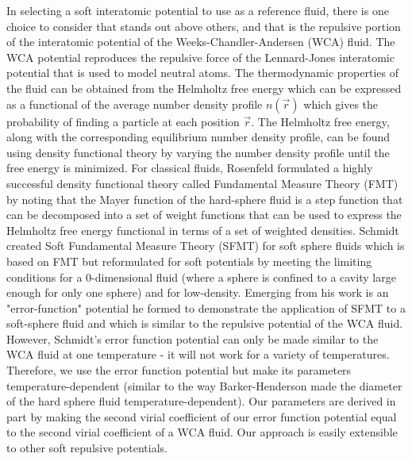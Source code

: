 \documentclass[double,12pt]{revtex4-2}
\begin{document}
In selecting a soft interatomic potential to use as a reference fluid, 
there is one choice to consider that stands out above others, and that is 
the repulsive portion of the interatomic potential of the 
Weeks-Chandler-Andersen (WCA) fluid.
The WCA potential reproduces the repulsive force of the Lennard-Jones 
interatomic potential that is used to model neutral atoms. 
The thermodynamic properties of the fluid can be obtained from the 
Helmholtz free energy which
can be expressed as a functional of the average number 
density profile $n(\vec r)$ 
which gives the probability of finding a particle at each position $\vec r$. 
The Helmholtz free energy, along with the corresponding equilibrium number density profile,
can be found using density functional theory by 
varying the number density profile until the free energy is minimized.
For classical fluids, Rosenfeld formulated a highly successful 
density functional theory called Fundamental Measure Theory (FMT)
by noting that the Mayer function of the hard-sphere fluid is a step function
that can be decomposed into a set of weight functions that can be used 
to express the Helmholtz free energy functional in terms of a set of weighted densities. 
Schmidt created Soft Fundamental Measure Theory (SFMT) for soft sphere 
fluids which is based on FMT but reformulated for soft potentials by 
meeting the limiting conditions for a 0-dimensional fluid (where a sphere 
is confined to a cavity large enough for only one sphere) 
and for low-density. 
Emerging from his work is an "error-function" potential he formed to 
demonstrate the application of SFMT to a soft-sphere fluid and which is
similar to the repulsive potential of the WCA fluid. However, 
Schmidt's error function potential can only be made similar to the WCA fluid 
at one temperature -
it will not work for a variety of temperatures. 
Therefore, we use the error function potential but make
its parameters temperature-dependent (similar to the way Barker-Henderson made the
diameter of the hard sphere fluid temperature-dependent). 
Our parameters are derived in part by making 
the second virial coefficient of our error function 
potential equal to the second virial coefficient of a WCA fluid. 
Our approach is easily extensible to other soft repulsive potentials.
\end{document}
